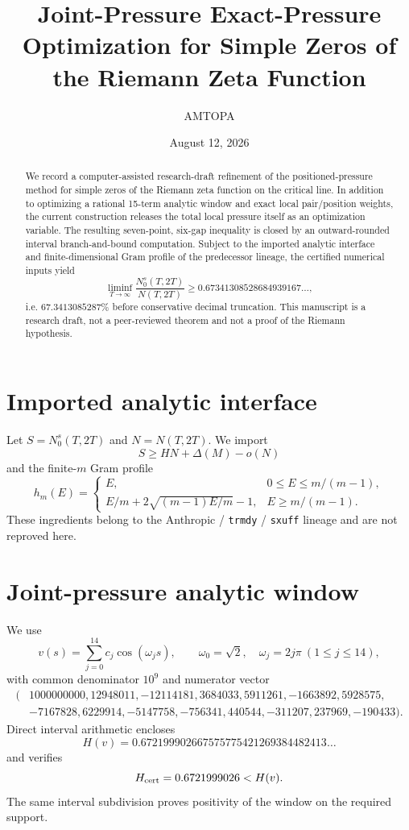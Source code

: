 \documentclass[11pt]{article}
\title{Joint-Pressure Exact-Pressure Optimization for Simple Zeros of the Riemann Zeta Function}
\author{AMTOPA}
\date{August 12, 2026}
\begin{document}
\maketitle

\begin{abstract}
We record a computer-assisted research-draft refinement of the positioned-pressure method for simple zeros of the Riemann zeta function on the critical line. In addition to optimizing a rational 15-term analytic window and exact local pair/position weights, the current construction releases the total local pressure itself as an optimization variable. The resulting seven-point, six-gap inequality is closed by an outward-rounded interval branch-and-bound computation. Subject to the imported analytic interface and finite-dimensional Gram profile of the predecessor lineage, the certified numerical inputs yield
\[
\liminf_{T\to\infty}\frac{N_0^s(T,2T)}{N(T,2T)}
\ge0.67341308528684939167\ldots,
\]
i.e. $67.3413085287\%$ before conservative decimal truncation. This manuscript is a research draft, not a peer-reviewed theorem and not a proof of the Riemann hypothesis.
\end{abstract}

\section{Imported analytic interface}
Let $S=N_0^s(T,2T)$ and $N=N(T,2T)$. We import
\[
S\ge HN+\Delta(M)-o(N)
\]
and the finite-$m$ Gram profile
\[
h_m(E)=\begin{cases}
E,&0\le E\le m/(m-1),\\
E/m+2\sqrt{(m-1)E/m}-1,&E\ge m/(m-1).
\end{cases}
\]
These ingredients belong to the Anthropic / \texttt{trmdy} / \texttt{sxuff} lineage and are not reproved here.

\section{Joint-pressure analytic window}
We use
\[
v(s)=\sum_{j=0}^{14}c_j\cos(\omega_js),\qquad
\omega_0=\sqrt2,\quad \omega_j=2j\pi\ (1\le j\le14),
\]
with common denominator $10^9$ and numerator vector
\[
\begin{split}
(&1000000000,12948011,-12114181,3684033,5911261,-1663892,5928575,\\
&-7167828,6229914,-5147758,-756341,440544,-311207,237969,-190433).
\end{split}
\]
Direct interval arithmetic encloses
\[
H(v)=0.672199902667575775421269384482413\ldots
\]
and verifies
\[
H_{\rm cert}=0.6721999026<H(v).
\]
The same interval subdivision proves positivity of the window on the required support.
\end{document}
